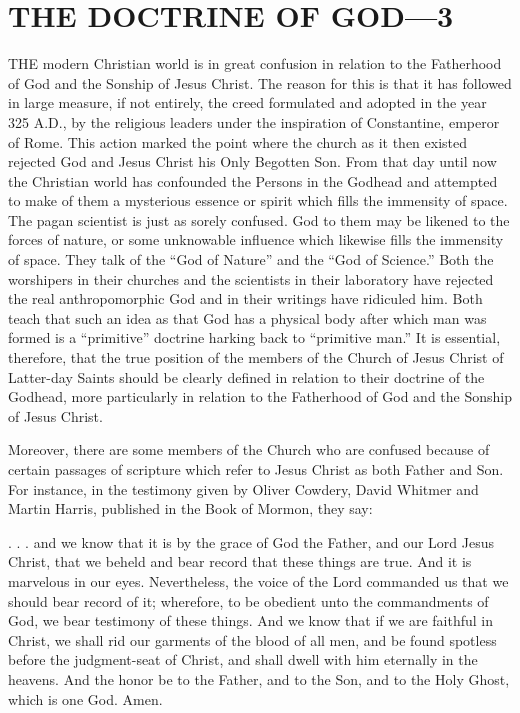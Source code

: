 \chapter{THE DOCTRINE OF GOD—3}

THE modern Christian world is in great confusion in relation to the Fatherhood of God and
the Sonship of Jesus Christ. The reason for this is that it has followed in large measure, if not
entirely, the creed formulated and adopted in the year 325 A.D., by the religious leaders
under the inspiration of Constantine, emperor of Rome. This action marked the point where
the church as it then existed rejected God and Jesus Christ his Only Begotten Son. From that
day until now the Christian world has confounded the Persons in the Godhead and attempted
to make of them a mysterious essence or spirit which fills the immensity of space. The pagan
scientist is just as sorely confused. God to them may be likened to the forces of nature, or
some unknowable influence which likewise fills the immensity of space. They talk of the
``God of Nature'' and the ``God of Science.'' Both the worshipers in their churches and the
scientists in their laboratory have rejected the real anthropomorphic God and in their writings
have ridiculed him. Both teach that such an idea as that God has a physical body after which
man was formed is a ``primitive'' doctrine harking back to ``primitive man.'' It is essential,
therefore, that the true position of the members of the Church of Jesus Christ of Latter-day
Saints should be clearly defined in relation to their doctrine of the Godhead, more
particularly in relation to the Fatherhood of God and the Sonship of Jesus Christ.

Moreover, there are some members of the Church who are confused because of certain
passages of scripture which refer to Jesus Christ as both Father and Son. For instance, in the
testimony given by Oliver Cowdery, David Whitmer and Martin Harris, published in the
Book of Mormon, they say:

. . . and we know that it is by the grace of God the Father, and our Lord Jesus Christ, that we
beheld and bear record that these things are true. And it is marvelous in our eyes.
Nevertheless, the voice of the Lord commanded us that we should bear record of it;
wherefore, to be obedient unto the commandments of God, we bear testimony of these
things. And we know that if we are faithful in Christ, we shall rid our garments of the blood
of all men, and be found spotless before the judgment-seat of Christ, and shall dwell with
him eternally in the heavens. And the honor be to the Father, and to the Son, and to the Holy
Ghost, which is one God. Amen.

